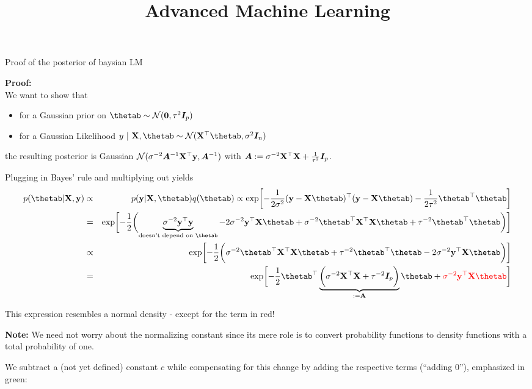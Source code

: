 \documentclass[11pt,compress,t,notes=noshow, xcolor=table]{beamer}
\title{Advanced Machine Learning}
\date{}
\begin{document}

\begin{vbframe}{Proof of the posterior of baysian LM}
\begin{footnotesize}
\textbf{Proof:}\\
    We want to show that 
    \begin{itemize}
      \item for a Gaussian prior on $\thetab \sim \mathcal{N}(\zero, \tau^2 \id_p)$
      \item for a Gaussian Likelihood $y ~|~ \Xmat, \thetab \sim \mathcal{N}(\Xmat^\top \thetab, \sigma^2 \id_n)$ 
    \end{itemize}
    the resulting posterior is Gaussian $\mathcal{N}(\sigma^{-2}\bm{A}^{-1}\mathbf{X}^\top\mathbf{y}, \bm{A}^{-1})$ with $\bm{A}:= \sigma^{-2}\mathbf{X}^\top\mathbf{X} + \frac{1}{\tau^2} \bm{I}_p$.
    
    Plugging in Bayes' rule and multiplying out yields
    \begin{eqnarray*}
    p(\thetab | \Xmat, \yv) &\propto& p(\yv | \Xmat, \thetab) q(\thetab) \propto \exp\biggl[-\frac{1}{2\sigma^2}(\yv - \Xmat\thetab)^\top(\yv - \Xmat\thetab)-\frac{1}{2\tau^2}\thetab^\top\thetab\biggr] \\
    &=& \exp\biggl[-\frac{1}{2}\biggl(\underbrace{\sigma^{-2}\yv^\top\yv}_{\text{doesn't depend on } \thetab} - 2 \sigma^{-2} \yv^\top \Xmat \thetab + \sigma^{-2}\thetab^\top \Xmat^\top \Xmat \thetab  + \tau^{-2} \thetab^\top\thetab \biggr)\biggr] \\
    &\propto& \exp\biggl[-\frac{1}{2}\biggl(\sigma^{-2}\thetab^\top \Xmat^\top \Xmat \thetab  + \tau^{-2} \thetab^\top\thetab  - 2 \sigma^{-2} \yv^\top \Xmat \thetab \biggr)\biggr] \\
    &=& \exp\biggl[-\frac{1}{2}\thetab^\top\underbrace{\biggl(\sigma^{-2} \Xmat^\top \Xmat + \tau^{-2} \id_p \biggr)}_{:= \Amat} \thetab + \textcolor{red}{\sigma^{-2} \yv^\top \Xmat \thetab}\biggr]
    \end{eqnarray*}
    
    This expression resembles a normal density - except for the term in red!
    
    \framebreak

    \textbf{Note:} We need not worry about the normalizing constant since its mere role is to convert probability functions to density functions with a total probability of one.
    
    
    We subtract a (not yet defined) constant $c$ while compensating for this change by adding the respective terms (\enquote{adding $0$}), emphasized in green:
    

\end{footnotesize}
\end{vbframe}
\end{document}
